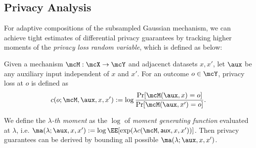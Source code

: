 \subsection{Privacy Analysis}
\label{sec:privacy_analysis_appendix}

\iffalse
In this section we provide the tools used in our analysis of differentially private pseudocoreset construction.

Guarantees of adaptive composition of differentially private mechanisms can be obtained according to following theorem:

\bnthm [Compositions of Differential Privacy~\citep{boosting_and_dp, dwork14, kairouz15, murtagh16}]
\label{theorem:dp_compositions}
Suppose that $ \mcM $ is an adaptive composition of $ K $ mechanisms $ {\mcM:\Pi_{k=1}^{K-1} \mcY_k \times X \rightarrow \mcY_K}$, i.e. $ \mcM = \mcM_K \circ \ldots \circ \mcM_1$, each satisfying $(\veps_k, \delta_k)$-differential privacy. Then $ \mcM $ is $(\veps', \sum_{k=1}^K \delta_k + \delta')$-differentially private for any $\delta'>0$, where
$$ \veps' = \min \left\{ \sum_{k=1}^{K} \veps_k, \sum_{k=1}^K \veps_k\frac{e^{\veps_k}-1}{e^{\veps_k} + 1} + \sqrt{2\sum_{k=1}^{K}\veps_k^2\ln(1/\delta')} \right\}.$$
\iffalse
\begin{itemize}
	\item $\veps' = K\veps$ and $\delta' = K\delta$. (Basic Composition) 
	\item $\veps' = \veps\sqrt{2K\log(1/\delta'')} + \veps(e^{\veps}-1)K  $ and $ {\delta' = K\delta + \delta''}$, for every $ \delta'' > 0$. (Advanced Composition).
\end{itemize}
\fi
\enthm
\fi 
For adaptive compositions of the subsampled Gaussian mechanism, we can achieve tight estimates of differential privacy guarantees by tracking higher moments of the \emph{privacy loss random variable}, which is defined as below:

\label{def:privacy_loss}
{Given a mechanism ${\mcM: \mcX \rightarrow \mcY}$ and adjacenct datasets $x, x'$, let $\aux$ be any auxiliary input independent of $x$ and $x'$. For an outcome $ o \in \mcY$, privacy loss at $ o $ is defined as $$ c(o; \mcM, \aux, x, x') := \log \frac{\Pr[\mcM(\aux, x)=o]}{\Pr[\mcM(\aux, x')=o]}.$$
}

We define the \emph{$\lambda$-th moment}  as the $\log$ of \emph{moment generating function} evaluated at $\lambda$, i.e. $  {\ma(\lambda; \aux, x, x') := \log \EE[\exp(\lambda c(\mcM, \mathsf{aux}, x, x'))]}$. Then privacy guarantees can be derived by bounding all possible $  \ma(\lambda; \aux, x, x')$.

